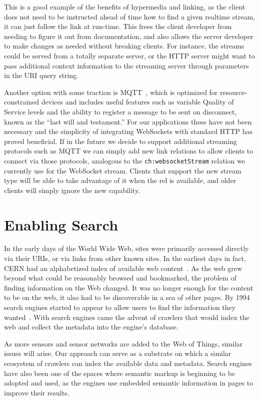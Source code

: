 \documentclass{acm_proc_article-sp}
\begin{document}
This is a good example of the benefits of hypermedia and linking, as the client
does not need to be instructed ahead of time how to find a given realtime
stream, it can just follow the link at run-time. This frees the client
developer from needing to figure it out from documentation, and also allows the
server developer to make changes as needed without breaking clients. For
instance, the streams could be served from a totally separate server, or the
HTTP server might want to pass additional context information to the streaming
server through parameters in the URI query string.

Another option with some traction is MQTT~\cite{collina2012}, which is
optimized for resource-constrained devices and includes useful features such as
variable Quality of Service levels and the ability to register a message to be
sent on disconnect, known as the ``last will and testament.'' For our
applications these have not been necessary and the simplicity of integrating
WebSockets with standard HTTP has proved beneficial. If in the future we decide
to support additional streaming protocols such as MQTT we can simply add new
link relations to allow clients to connect via those protocols, analogous to
the \texttt{ch:websocketStream} relation we currently use for the WebSocket
stream. Clients that support the new stream type will be able to take advantage
of it when the rel is available, and older clients will simply ignore the new
capability.

\pagebreak

\section{Enabling Search}
\label{search}

In the early days of the World Wide Web, sites were primarily accessed directly
via their URIs, or via links from other known sites. In the earliest days in
fact, CERN had an alphabetized index of available web
content~\cite{websearchengines}. As the web grew beyond what could be
reasonably browsed and bookmarked, the problem of finding information on the
Web changed. It was no longer enough for the content to be on the web, it also
had to be discoverable in a sea of other pages. By 1994 search engines started
to appear to allow users to find the information they
wanted~\cite{websearchengines}. With search engines came the advent of crawlers
that would index the web and collect the metadata into the engine's database.

As more sensors and sensor networks are added to the Web of Things, similar
issues will arise. Our approach can serve as a substrate on which a similar
ecosystem of crawlers can index the available data and metadata. Search engines
have also been one of the spaces where semantic markup is beginning to be
adopted and used,  as the engines use embedded semantic information in pages to
improve their results.
\end{document}

